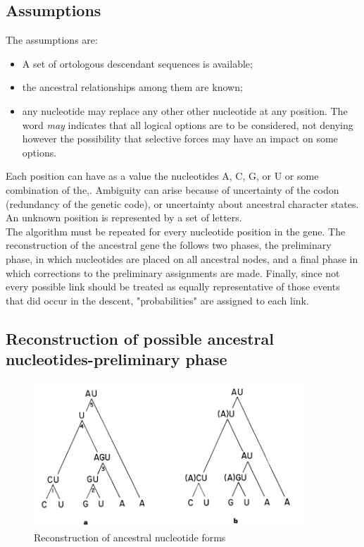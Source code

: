 \subsection{Assumptions}
The assumptions are:
\begin{itemize}
\item A set of ortologous descendant sequences is available;
\item the ancestral relationships among them are known;
\item any nucleotide may replace any other other nucleotide at any position. The word \textit{may} indicates that all logical options are to be considered, not denying however the possibility that selective forces may have an impact on some options.
\end{itemize}

Each position can have as a value the nucleotides A, C, G, or U or some combination of the,. Ambiguity can arise because of uncertainty of the codon (redundancy of the genetic code), or uncertainty about ancestral character states. An unknown position is represented by a set of letters.
\\
The algorithm must be repeated for every nucleotide position in the gene. The reconstruction of the ancestral gene the follows two phases, the preliminary phase, in which nucleotides are placed on all ancestral nodes, and a final phase in which corrections to the preliminary assignments are made.
Finally, since not every possible link should be treated as equally representative of those events that did occur in the descent, "probabilities" are assigned to each link.


\subsection{Reconstruction of possible ancestral nucleotides-preliminary phase}
\begin{figure}[H]
		\centering
		\includegraphics[width=0.9\textwidth]{2.png}
		\caption{Reconstruction of ancestral nucleotide forms }
		\label{fig:preliminary}
	\end{figure}

